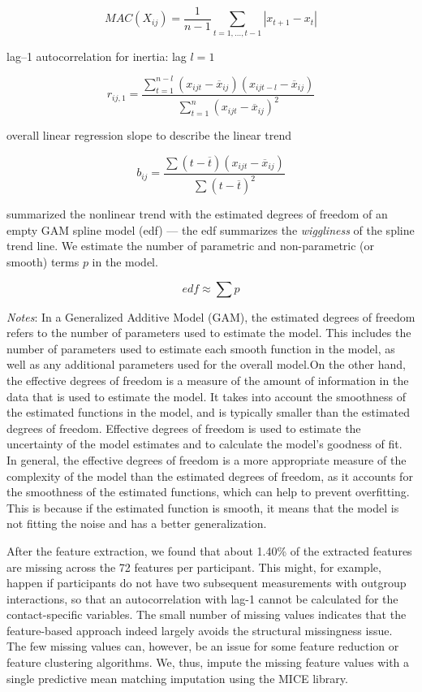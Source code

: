 \begin{equation} \label{eq:mac}
  MAC(X_{ij}) = \frac{1}{n-1} \sum_{t=1, \ldots, t-1}\left|x_{t+1}-x_t\right|
\end{equation}

lag--1 autocorrelation for inertia: lag \(l=1\)

\begin{equation} \label{eq:ar}
  r_{ij,1} = \frac{\sum_{t=1}^{n-l}(x_{ijt}-\overline{x}_{ij})(x_{ijt-l}-\overline{x}_{ij})}{\sum_{t=1}^{n}(x_{ijt}-\overline{x}_{ij})^2}
\end{equation}

overall linear regression slope to describe the linear trend

\begin{equation} \label{eq:lin}
  b_{ij} = \frac{\sum(t-\overline{t})(x_{ijt}-\overline{x}_{ij})}{\sum(t-\overline{t})^2}
\end{equation}

summarized the nonlinear trend with the estimated degrees of freedom of
an empty GAM spline model (edf) --- the edf summarizes the
\textit{wiggliness} of the spline trend line. We estimate the number of
parametric and non-parametric (or smooth) terms \(p\) in the model.

\begin{equation} \label{eq:edf}
  edf \approx \sum p
\end{equation}

\textit{Notes}: In a Generalized Additive Model (GAM), the estimated
degrees of freedom refers to the number of parameters used to estimate
the model. This includes the number of parameters used to estimate each
smooth function in the model, as well as any additional parameters used
for the overall model.On the other hand, the effective degrees of
freedom is a measure of the amount of information in the data that is
used to estimate the model. It takes into account the smoothness of the
estimated functions in the model, and is typically smaller than the
estimated degrees of freedom. Effective degrees of freedom is used to
estimate the uncertainty of the model estimates and to calculate the
model's goodness of fit. In general, the effective degrees of freedom is
a more appropriate measure of the complexity of the model than the
estimated degrees of freedom, as it accounts for the smoothness of the
estimated functions, which can help to prevent overfitting. This is
because if the estimated function is smooth, it means that the model is
not fitting the noise and has a better generalization.

After the feature extraction, we found that about 1.40\% of the
extracted features are missing across the 72 features per participant.
This might, for example, happen if participants do not have two
subsequent measurements with outgroup interactions, so that an
autocorrelation with lag-1 cannot be calculated for the contact-specific
variables. The small number of missing values indicates that the
feature-based approach indeed largely avoids the structural missingness
issue. The few missing values can, however, be an issue for some feature
reduction or feature clustering algorithms. We, thus, impute the missing
feature values with a single predictive mean matching imputation using
the MICE library.
